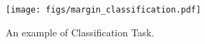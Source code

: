 \begin{figure}[h!]
    \centering
    \texttt{[image: figs/margin\_classification.pdf]}
    \caption{An example of Classification Task.}
    \label{fig:example_classification}
    \vspace{-10pt}
\end{figure}